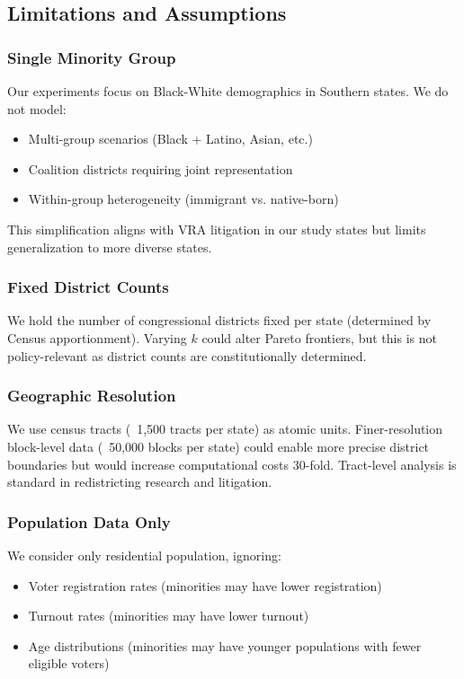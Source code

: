 \subsection{Limitations and Assumptions}

\subsubsection{Single Minority Group}

Our experiments focus on Black-White demographics in Southern states. We do not model:
\begin{itemize}
    \item Multi-group scenarios (Black + Latino, Asian, etc.)
    \item Coalition districts requiring joint representation
    \item Within-group heterogeneity (immigrant vs. native-born)
\end{itemize}

This simplification aligns with VRA litigation in our study states but limits generalization to more diverse states.

\subsubsection{Fixed District Counts}

We hold the number of congressional districts fixed per state (determined by Census apportionment). Varying $k$ could alter Pareto frontiers, but this is not policy-relevant as district counts are constitutionally determined.

\subsubsection{Geographic Resolution}

We use census tracts (~1,500 tracts per state) as atomic units. Finer-resolution block-level data (~50,000 blocks per state) could enable more precise district boundaries but would increase computational costs 30-fold. Tract-level analysis is standard in redistricting research and litigation.

\subsubsection{Population Data Only}

We consider only residential population, ignoring:
\begin{itemize}
    \item Voter registration rates (minorities may have lower registration)
    \item Turnout rates (minorities may have lower turnout)
    \item Age distributions (minorities may have younger populations with fewer eligible voters)
\end{itemize}

